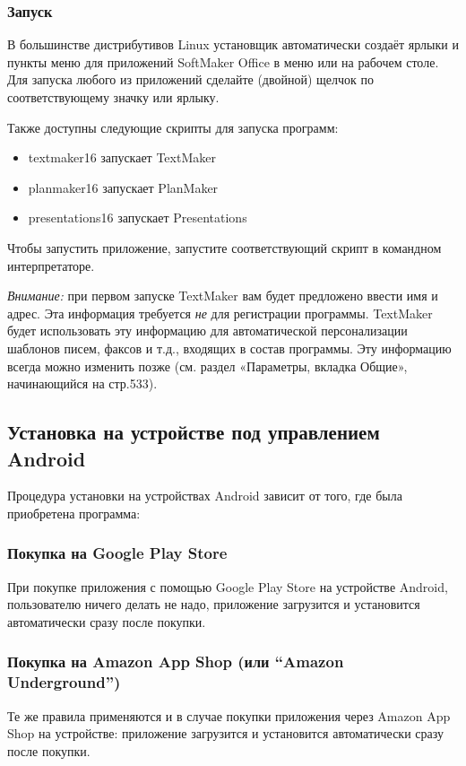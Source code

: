\documentclass[a4paper,10pt]{article}
\begin{document}
\subsubsection{Запуск}
В большинстве дистрибутивов Linux установщик автоматически создаёт ярлыки и пункты меню для приложений SoftMaker Office в меню или на рабочем столе. Для запуска любого из приложений сделайте (двойной) щелчок по соответствующему значку или ярлыку.

Также доступны следующие скрипты для запуска программ:
\begin{itemize}
 \item textmaker16 запускает TextMaker
 \item planmaker16 запускает PlanMaker
 \item presentations16 запускает Presentations
\end{itemize}

Чтобы запустить приложение, запустите соответствующий скрипт в командном интерпретаторе.

{\footnotesize \textit{Внимание:} при первом запуске TextMaker вам будет предложено ввести имя и адрес. Эта информация требуется \textit{не} для регистрации программы. TextMaker будет использовать эту информацию для автоматической персонализации шаблонов писем, факсов и т.д., входящих в состав программы. Эту информацию всегда можно изменить позже (см. раздел «Параметры, вкладка Общие», начинающийся на стр.533).}

\subsection{Установка на устройстве под управлением Android}
Процедура установки на устройствах Android зависит от того, где была приобретена программа:
\subsubsection{Покупка на Google Play Store}
При покупке приложения с помощью Google Play Store на устройстве Android, пользователю ничего делать не надо, приложение загрузится и установится автоматически сразу после покупки.
\subsubsection{Покупка на Amazon App Shop (или “Amazon Underground”)}
Те же правила применяются и в случае покупки приложения через Amazon App Shop на устройстве: приложение загрузится и установится автоматически сразу после покупки.
\end{document}
